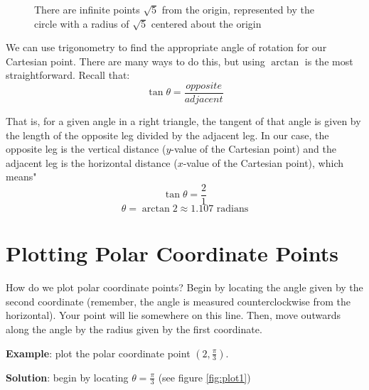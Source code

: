 \begin{figure}[htbp]
\centering
    \caption{There are infinite points $\sqrt{5}$ from the origin, represented 
    by the circle with a radius of $\sqrt{5}$ centered about the origin}
    \label{fig:circle}
    \end{figure}

We can use trigonometry to find the appropriate angle of rotation for our 
Cartesian point. There are many ways to do this, but using $\arctan$ is the 
most straightforward. Recall that:
$$\tan{\theta} = \frac{opposite}{adjacent}$$

That is, for a given angle in a right triangle, the tangent of that angle is 
given by the length of the opposite leg divided by the adjacent leg. In our 
case, the opposite leg is the vertical distance ($y$-value of the Cartesian 
point) and the adjacent leg is the horizontal distance ($x$-value of the 
Cartesian point), which means"
$$\tan{\theta} = \frac{2}{1}$$
$$\theta = \arctan{2} \approx 1.107\text{ radians}$$

\section{Plotting Polar Coordinate Points}
How do we plot polar coordinate points? Begin by locating the angle given by the second coordinate (remember, the angle is measured counterclockwise from the horizontal). Your point will lie somewhere on this line. Then, move outwards along the angle by the radius given by the first coordinate. 

\textbf{Example}: plot the polar coordinate point $(2, \frac{\pi}{3})$. 

\textbf{Solution}: begin by locating $\theta = \frac{\pi}{3}$ (see figure \ref{fig:plot1})


